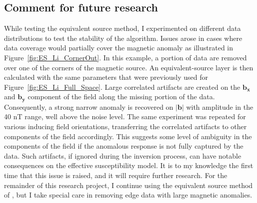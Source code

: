 \subsection{Comment for future research}
While testing the equivalent source method, I experimented on different data distributions to test the stability of the algorithm.
Issues arose in cases where data coverage would partially cover the magnetic anomaly as illustrated in Figure~\ref{fig:ES_Li_CornerOut}.
In this example, a portion of data are removed over one of the corners of the magnetic source.
An equivalent-source layer is then calculated with the same parameters that were previously used for Figure~\ref{fig:ES_Li_Full_Space}.
Large correlated artifacts are created on the $\mathbf{b_x}$ and $\mathbf{b_y}$ component of the field along the missing portion of the data. 
Consequently, a strong narrow anomaly is recovered on $\mathbf{|b|}$ with amplitude in the 40 nT range, well above the noise level.
The same experiment was repeated for various inducing field orientations, transferring the correlated artifacts to other components of the field accordingly.
This suggests some level of ambiguity in the components of the field if the anomalous response is not fully captured by the data.
Such artifacts, if ignored during the inversion process, can have notable consequences on the effective susceptibility model.
It is to my knowledge the first time that this issue is raised, and it will require further research.  
For the remainder of this research project, I continue using the equivalent source method of \cite{LiNabighian14}, but I take special care in removing edge data with large magnetic anomalies.

